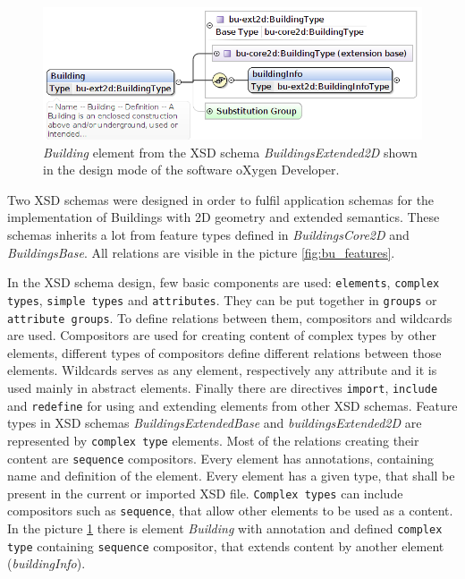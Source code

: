 \documentclass[eprint]{actapoly}
\begin{document}
\begin{figure}
\centering
\includegraphics[width=0.8\linewidth]{pics/BU_dedicnost_info.png} %
\caption{\textit{Building} element from the XSD schema \textit{BuildingsExtended2D} shown in the design mode of the software oXygen Developer.}
\label{fig:bu_building_element_oxy}
\end{figure}

Two XSD schemas were designed in order to fulfil application schemas for the implementation of Buildings with 2D geometry and extended semantics. These schemas inherits a lot from feature types defined in \textit{BuildingsCore2D} and \textit{BuildingsBase}. All relations are visible in the picture \ref{fig:bu_features}. 

In the XSD schema design, few basic components are used: \texttt{elements}, \texttt{complex types}, \texttt{simple types} and \texttt{attributes}. They can be put together in \texttt{groups} or \texttt{attribute groups}. To define relations between them, compositors and wildcards are used. Compositors are used for creating content of complex types by other elements, different types of compositors define different relations between those elements. Wildcards serves as any element, respectively any attribute and it is used mainly in abstract elements. Finally there are directives \texttt{import}, \texttt{include }and \texttt{redefine} for using and extending elements from other XSD schemas. Feature types in XSD schemas \textit{BuildingsExtendedBase} and \textit{buildingsExtended2D} are represented by \texttt{complex type} elements. Most of the relations creating their content are \texttt{sequence} compositors. Every element has annotations, containing name and definition of the element. Every element has a given type, that shall be present in the current or imported XSD file. \texttt{Complex types} can include compositors such as \texttt{sequence}, that allow other elements to be used as a content.  In the picture \ref{fig:bu_building_element_oxy} there is element \textit{Building} with annotation and defined \texttt{complex type} containing \texttt{sequence} compositor, that extends content by another element (\textit{buildingInfo}).
\end{document}
